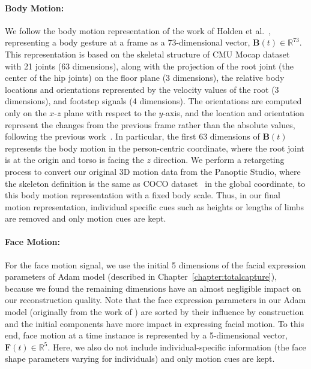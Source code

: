 \paragraph{Body Motion:} We follow the body motion representation of the work of Holden et al.~\cite{holden2016deep}, representing a body gesture at a frame as a 73-dimensional vector, $\mathbf{B}(t) \in \mathbb{R}^{73}$. This representation is based on the skeletal structure of CMU Mocap dataset~\cite{gross2001cmu} with 21 joints (63 dimensions), along with the projection of the root joint (the center of the hip joints) on the floor plane (3 dimensions), the relative body locations and orientations represented by the velocity values of the root (3 dimensions), and footstep signals (4 dimensions). The orientations are computed only on the $x$-$z$ plane with respect to the $y$-axis, and the location and orientation represent the changes from the previous frame rather than the absolute values, following the previous work~\cite{jain2016structural, holden2016deep}. In particular, the first 63 dimensions of $\mathbf{B}(t)$ represents the body motion in the person-centric coordinate, where the root joint is at the origin and torso is facing the $z$ direction. We perform a retargeting process to convert our original 3D motion data from the Panoptic Studio, where the skeleton definition is the same as COCO dataset~\cite{coco-14} in the global coordinate, to this body motion representation with a fixed body scale. Thus, in our final motion representation, individual specific cues such as heights or lengths of limbs are removed and only motion cues are kept.

\paragraph{Face Motion:} For the face motion signal, we use the initial 5 dimensions of the facial expression parameters of Adam model (described in Chapter~\ref{chapter:totalcapture}), because we found the remaining dimensions have an almost negligible impact on our reconstruction quality. Note that the face expression parameters in our Adam model (originally from the work of \cite{cao2014facewarehouse}) are sorted by their influence by construction and the initial components have more impact in expressing facial motion. To this end, face motion at a time instance is represented by a 5-dimensional vector, $\mathbf{F}(t) \in \mathbb{R}^{5}$. Here, we also do not include individual-specific information (the face shape parameters varying for individuals) and only motion cues are kept.
 
